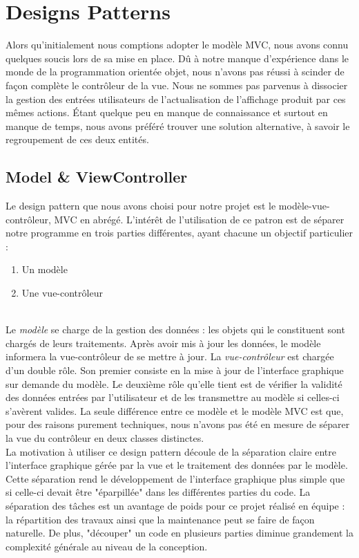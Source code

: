 \newpage
\section{Designs Patterns}
Alors qu'initialement nous comptions adopter le modèle MVC, nous avons connu quelques 
soucis lors de sa mise en place. Dû à notre manque d'expérience dans le monde de la  
programmation orientée objet, nous n'avons pas réussi à scinder de façon complète 
le contrôleur de la vue. Nous ne sommes pas parvenus à dissocier la gestion des
entrées utilisateurs de l'actualisation de l'affichage produit par ces mêmes actions.
Étant quelque peu en manque de connaissance et surtout en manque de temps, nous avons
préféré trouver une solution alternative, à savoir le regroupement de ces deux entités.

\subsection{Model \& ViewController}
Le design pattern que nous avons choisi pour notre projet est le modèle-vue-contrôleur, 
MVC en abrégé. L'intérêt de l'utilisation de ce patron est de séparer notre programme 
en trois parties différentes, ayant chacune un objectif particulier :
\begin{enumerate}
\item Un modèle
\item Une vue-contrôleur
\end{enumerate}\ \\
Le \textit{modèle} se charge de la gestion des données : les objets qui le constituent sont 
chargés de leurs traitements. Après avoir mis à jour les données, le modèle informera la  
vue-contrôleur de se mettre à jour. La \textit{vue-contrôleur} est chargée d'un double 
rôle. Son premier consiste en la mise à jour de l'interface graphique sur demande du modèle.
Le deuxième rôle qu'elle tient est de vérifier la validité des données entrées par l'utilisateur
et de les transmettre au modèle si celles-ci s'avèrent valides. La seule différence entre 
ce modèle et le modèle MVC est que, pour des raisons purement techniques, nous n'avons pas été en 
mesure de séparer la vue du contrôleur en deux classes distinctes.\\

La motivation à utiliser ce design pattern découle de la séparation claire entre 
l'interface graphique gérée par la vue et le traitement des données par le modèle. 
Cette séparation rend le développement de l'interface graphique plus simple que si
celle-ci devait être "éparpillée" dans les différentes parties du code. La 
séparation des tâches est un avantage de poids pour ce projet réalisé en équipe : la
répartition des travaux ainsi que la maintenance peut se faire de façon naturelle. De 
plus, "découper" un code en plusieurs parties diminue grandement la complexité générale 
au niveau de la conception.


